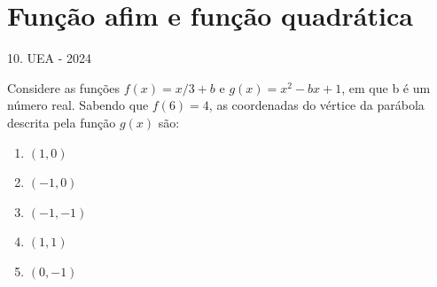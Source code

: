 \documentclass[11pt]{beamer}
\begin{document}
\section{Função afim e função quadrática}
\begin{frame}{10. UEA - 2024}

    Considere as funções $f(x)={x}/{3}+b$ e $g(x)=x^{2}-bx+1$, em que b é um número real. Sabendo que $f(6)=4$, as coordenadas do vértice da parábola descrita pela função $g(x)$ são:

    \begin{enumerate}[a]
        \item $(1,0)$ %
        \item $(-1,0)$
        \item $(-1,-1)$
        \item $(1,1)$ 
        \item $(0,-1)$
    \end{enumerate}

\end{frame}
\end{document}
